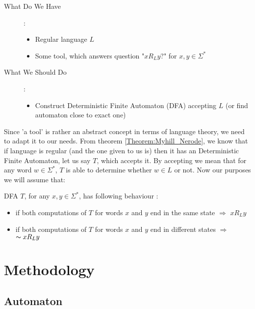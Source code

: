 \documentclass[runningheads,a4paper]{llncs}
\begin{document}
\begin{description}
  \item[What Do We Have]: 
   	\begin{itemize}
		\item Regular language $L$
		\item Some tool, which answers question "$x R_{L} y$?" for $x,y \in \Sigma^{*}$
	\end{itemize}
  \item[What We Should Do]:
    \begin{itemize}
		\item Construct Deterministic Finite Automaton (DFA) accepting $L$ (or find automaton close to exact one)
	\end{itemize}
 \end{description}


Since 'a tool' is rather an abstract concept in terms of language theory, we need to adapt it to our needs. From theorem \ref{Theorem:Myhill_Nerode}, we know that if language is regular (and the one given to us is) then it has an Deterministic Finite Automaton, let us say $T$, which accepts it. By accepting we mean that for any word $w \in \Sigma^{*}$, $T$ is able to determine whether $w \in L$ or not. Now our purposes we will assume that:

\begin{definition} \label{def:T}
DFA $T$, for any $x,y \in \Sigma^{*}$, has following behaviour :
\begin{itemize}
  \item if both computations of $T$ for words $x$ and $y$ end in the same state $\Rightarrow$ $x R_{L} y$
  \item if both computations of $T$ for words $x$ and $y$ end in different states $\Rightarrow$ $\thicksim x R_{L} y$
\end{itemize}
\end{definition}

\section{Methodology}

\subsection{Automaton} \label{sec:autom}
\end{document}
